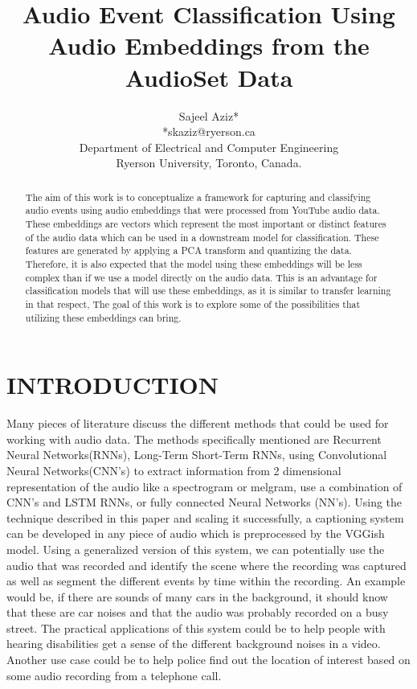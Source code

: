 \documentclass[journal]{IEEEtran}
\begin{document}
\title{Audio Event Classification Using Audio Embeddings from the AudioSet Data}

\author{Sajeel Aziz*\\
*skaziz@ryerson.ca\\
Department of Electrical and Computer Engineering\\
Ryerson University, Toronto, Canada.}
\maketitle

\begin{abstract}
The aim of this work is to conceptualize a framework for capturing and classifying audio events using audio embeddings that were processed from YouTube audio data. These embeddings are vectors which represent the most important or distinct features of the audio data which can be used in a downstream model for classification. These features are generated by applying a PCA transform and quantizing the data. Therefore, it is also expected that the model using these embeddings will be less complex than if we use a model directly on the audio data. This is an advantage for classification models that will use these embeddings, as it is similar to transfer learning in that respect, The goal of this work is to explore some of the possibilities that utilizing these embeddings can bring.

\end{abstract}

\section{INTRODUCTION}

Many pieces of literature discuss the different methods that could be used for working with audio data. The methods specifically mentioned are Recurrent Neural Networks(RNNs), Long-Term Short-Term RNNs, using Convolutional Neural Networks(CNN’s) to extract information from 2 dimensional representation of the audio like a spectrogram or melgram, use a combination of CNN’s and LSTM RNNs, or fully connected Neural Networks (NN’s). Using the technique described in this paper and scaling it successfully, a captioning system can be developed in any piece of audio which is preprocessed by the VGGish model. Using a generalized version of this system, we can potentially use the audio that was recorded and identify the scene where the recording was captured as well as segment the different events by time within the recording. An example would be, if there are sounds of many cars in the background, it should know that these are car noises and that the audio was probably recorded on a busy street. The practical applications of this system could be to help people with hearing disabilities get a sense of the different background noises in a video. Another use case could be to help police find out the location of interest based on some audio recording from a telephone call.
\end{document}
